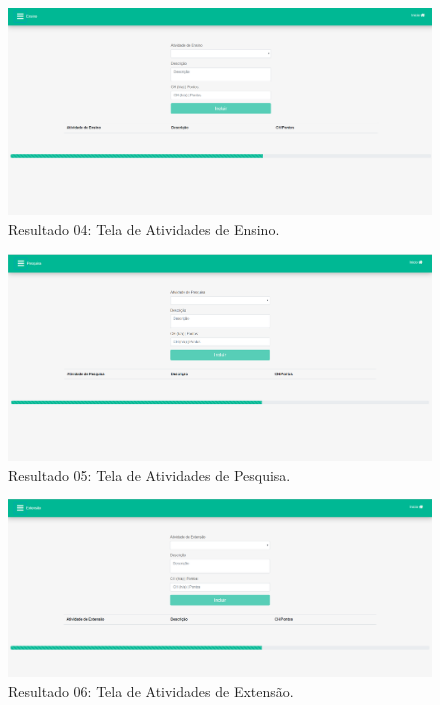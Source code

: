 \begin{figure}[htb]
    \centering
    \includegraphics[width=.8\textwidth]{img/pagina_ensino.PNG}
    \caption[Resultado 04: Tela de Atividades de Ensino]{Resultado 04: Tela de Atividades de Ensino.}
    \label{fig:result04}
\end{figure}

\begin{figure}[htb]
    \centering
    \includegraphics[width=.8\textwidth]{img/pagina_pesquisa.PNG}
    \caption[Resultado 05: Tela de Atividades de Pesquisa]{Resultado 05: Tela de Atividades de Pesquisa.}
    \label{fig:result05}
\end{figure}

\begin{figure}[htb]
    \centering
    \includegraphics[width=.8\textwidth]{img/pagina_extensao.PNG}
    \caption[Resultado 06: Tela de Atividades de Extensão]{Resultado 06: Tela de Atividades de Extensão.}
    \label{fig:result06}
\end{figure}

